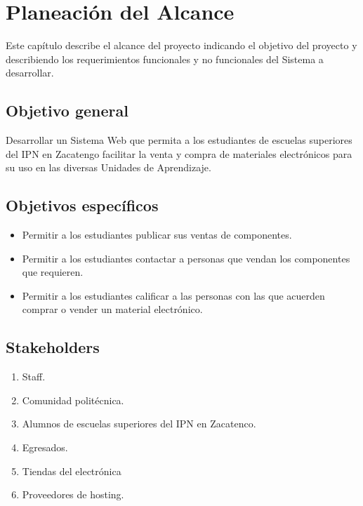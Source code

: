 \chapter{Planeación del Alcance}	
\label{cap:alcance}

	Este capítulo describe el alcance del proyecto indicando el objetivo del proyecto y describiendo los requerimientos funcionales y no funcionales del Sistema a desarrollar.

\section{Objetivo general}	

Desarrollar un Sistema Web que permita a los estudiantes de escuelas superiores del IPN en Zacatengo facilitar la venta y compra de materiales electrónicos para su uso en las diversas Unidades de Aprendizaje.

\section{Objetivos específicos}	

\begin{itemize}
	\item Permitir a los estudiantes publicar sus ventas de componentes.
	\item Permitir a los estudiantes contactar a personas que vendan los componentes que requieren.
	\item Permitir a los estudiantes calificar a las personas con las que acuerden comprar o vender un material electrónico.
\end{itemize}

\section{Stakeholders}
\begin{enumerate}
	\item Staff.
	\item Comunidad politécnica.
	\item Alumnos de escuelas superiores del IPN en Zacatenco.
	\item Egresados.
	\item Tiendas del electrónica
	\item Proveedores de hosting.
\end{enumerate}

